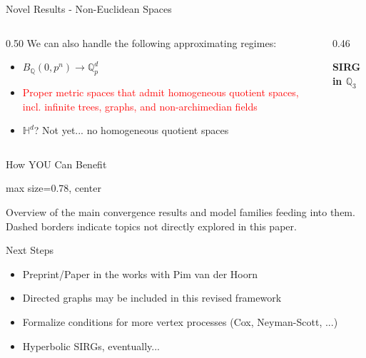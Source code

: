 \documentclass[aspectratio=169]{beamer}
\begin{document}
\begin{frame}{Novel Results - Non-Euclidean Spaces}
\begin{columns}[T,onlytextwidth]
    \begin{column}{0.50\textwidth}
        We can also handle the following approximating regimes:
        \begin{itemize}
            \item $B_{\mathbb{Q}}(0,p^n) \to \mathbb{Q}^d_p$
            \item \textcolor{red}{Proper metric spaces that admit homogeneous quotient spaces, incl. infinite trees, graphs, and non-archimedian fields}
            \item $\mathbb{H}^d$? Not yet... no homogeneous quotient spaces
        \end{itemize}
    \end{column}
    \begin{column}{0.46\textwidth}
        \centering
        \resizebox{\linewidth}{!}{}
        \par\vspace{0.12cm}
        \textbf{SIRG in $\mathbb{Q}_3$}
    \end{column}
\end{columns}
\end{frame}

\begin{frame}{How YOU Can Benefit }
    \centering

    \begin{adjustbox}{
        max size={\textwidth}{0.78\textheight},
        center
    }
        
    \end{adjustbox}

    \vspace{0.3em}
    {\tiny
    Overview of the main convergence results and model families feeding into them.
    Dashed borders indicate topics not directly explored in this paper.
    }
\end{frame}

\begin{frame}{Next Steps}
\begin{itemize}
    \item Preprint/Paper in the works with Pim van der Hoorn
    \item Directed graphs may be included in this revised framework
    \item Formalize conditions for more vertex processes (Cox, Neyman-Scott, ...)
    \item Hyperbolic SIRGs, eventually... 
\end{itemize}
\end{frame}
\end{document}

